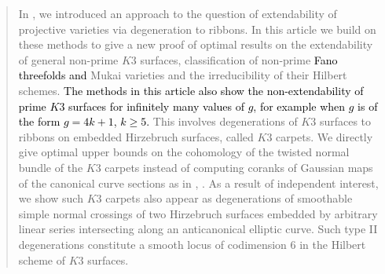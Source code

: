 \documentclass[11pt,twoside]{amsart}
\theoremstyle{plain}
\numberwithin{equation}{section}
\theoremstyle{definition}
\begin{document}
\maketitle
\begin{abstract}

In \cite{BM24}, we introduced an approach to the question of extendability of projective varieties via degeneration to ribbons. In this article we build on these methods to give a new proof of optimal results on the extendability of general non-prime $K3$ surfaces, classification of non-prime \textcolor{black}{Fano threefolds and} Mukai varieties and the irreducibility of their Hilbert schemes. 
\textcolor{black}{The methods in this article also show the non-extendability of prime $K3$ surfaces for infinitely many values of $g$, for example when $g$ is of the form $g = 4k+1$, $k \geq 5$.} 
This involves degenerations of $K3$ surfaces to ribbons on embedded Hirzebruch surfaces, called $K3$ carpets. We directly give optimal upper bounds on the cohomology of the twisted normal bundle of the $K3$ carpets instead of computing coranks of Gaussian maps of the canonical curve sections as in \cite{CLM94}, \cite{CLM98}. 
As a result of independent interest, we show such $K3$ carpets also appear as degenerations of smoothable simple normal crossings of two Hirzebruch surfaces embedded by arbitrary linear series intersecting along an anticanonical elliptic curve. 
Such type II degenerations constitute a smooth locus of codimension $6$ in the Hilbert scheme of $K3$ surfaces. 

\end{abstract}
\end{document}
